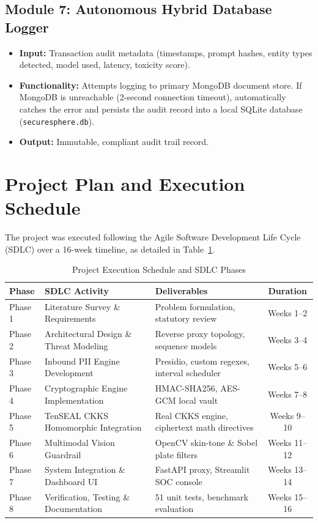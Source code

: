 \documentclass[12pt,a4paper,oneside]{report}
\numberwithin{equation}{chapter}
\begin{document}
\subsection{Module 7: Autonomous Hybrid Database Logger}
\begin{itemize}[leftmargin=*]
    \item \textbf{Input:} Transaction audit metadata (timestamps, prompt hashes, entity types detected, model used, latency, toxicity score).
    \item \textbf{Functionality:} Attempts logging to primary MongoDB document store. If MongoDB is unreachable (2-second connection timeout), automatically catches the error and persists the audit record into a local SQLite database (\texttt{securesphere.db}).
    \item \textbf{Output:} Immutable, compliant audit trail record.
\end{itemize}

\section{Project Plan and Execution Schedule}
The project was executed following the Agile Software Development Life Cycle (SDLC) over a 16-week timeline, as detailed in Table~\ref{tab:project_plan}.

\begin{table}[htbp]
\centering
\caption{Project Execution Schedule and SDLC Phases}\label{tab:project_plan}
\begin{tabular}{lllc}
\toprule
\textbf{Phase} & \textbf{SDLC Activity} & \textbf{Deliverables} & \textbf{Duration} \\
\midrule
Phase 1 & Literature Survey \& Requirements & Problem formulation, statutory review & Weeks 1--2 \\
Phase 2 & Architectural Design \& Threat Modeling & Reverse proxy topology, sequence models & Weeks 3--4 \\
Phase 3 & Inbound PII Engine Development & Presidio, custom regexes, interval scheduler & Weeks 5--6 \\
Phase 4 & Cryptographic Engine Implementation & HMAC-SHA256, AES-GCM local vault & Weeks 7--8 \\
Phase 5 & TenSEAL CKKS Homomorphic Integration & Real CKKS engine, ciphertext math directives & Weeks 9--10 \\
Phase 6 & Multimodal Vision Guardrail & OpenCV skin-tone \& Sobel plate filters & Weeks 11--12 \\
Phase 7 & System Integration \& Dashboard UI & FastAPI proxy, Streamlit SOC console & Weeks 13--14 \\
Phase 8 & Verification, Testing \& Documentation & 51 unit tests, benchmark evaluation & Weeks 15--16 \\
\bottomrule
\end{tabular}
\end{table}
\end{document}

